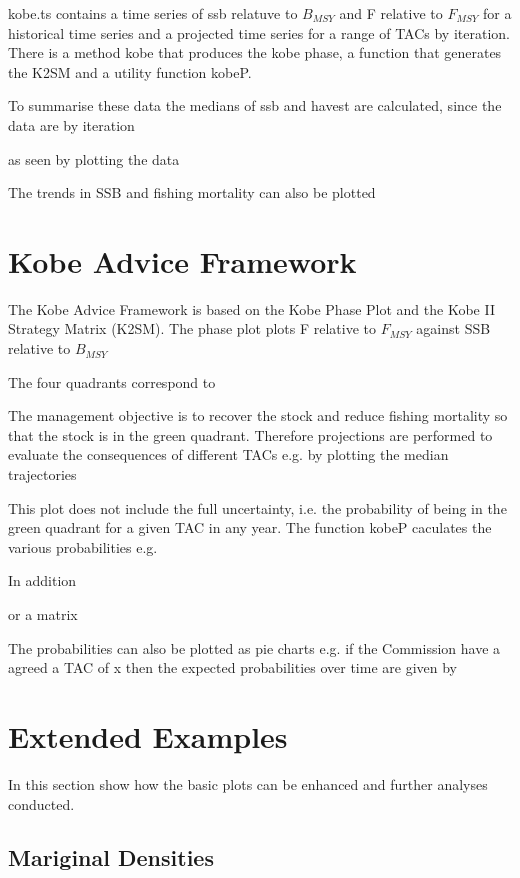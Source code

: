 \documentclass[a4paper, 11pt, oldtoc]{artikel1}
\begin{document}
kobe.ts contains a time series of ssb relatuve to $B_{MSY}$ and F relative to $F_{MSY}$ for a historical time series and a projected time series for a range of TACs by iteration.
There is a method kobe that produces the kobe phase, a function that generates the K2SM and a utility function kobeP.

To summarise these data the medians of ssb and havest are calculated, since the data are by iteration

as seen by plotting the data



The trends in SSB and fishing mortality can also be plotted



\section*{Kobe Advice Framework}

The Kobe Advice Framework is based on the Kobe Phase Plot and the Kobe II Strategy Matrix (K2SM). 
The phase plot plots F relative to $F_{MSY}$ against SSB relative to $B_{MSY}$


The four quadrants correspond to

The management objective is to recover the stock and reduce fishing mortality so that the stock is in the green quadrant. Therefore
projections are performed to evaluate the consequences of different TACs e.g. by plotting the median trajectories

This plot does not include the full uncertainty, i.e. the probability of being in the green quadrant for a given TAC in any year.
The function kobeP caculates the various probabilities e.g. 

In addition 


or a matrix


The probabilities can also be plotted as pie charts e.g. if the Commission have a agreed a TAC of x then the expected probabilities over time are given by


\section*{Extended Examples}

In this section show how the basic plots can be enhanced and further analyses conducted.

\subsection*{Mariginal Densities}
\end{document}
